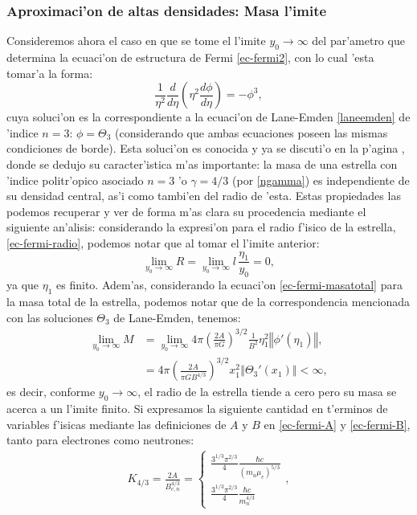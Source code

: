 \subsubsection{Aproximaci'on de altas densidades: Masa l'imite}\label{sec:ec-fermi-masalimite}
Consideremos ahora el caso en que se tome el l'imite $y_0\to\infty$ del par'ametro que determina la ecuaci'on de estructura de Fermi \eqref{ec-fermi2}, con lo cual 'esta tomar'a la forma:
\begin{equation}
\frac{1}{\eta^2}\frac{d}{d\eta}\left(\eta^2\frac{d\phi}{d\eta}\right)=-\phi^3,
\end{equation}
cuya soluci'on es la correspondiente a la  ecuaci'on de Lane-Emden \eqref{laneemden} de 'indice $n=3$: $\phi=\Theta_{3}$ (considerando que ambas ecuaciones poseen las mismas condiciones de borde). Esta soluci'on es conocida y ya se discuti'o en la p'agina \pageref{masa4/3}, donde se dedujo su caracter'istica m'as importante: la masa de una estrella con 'indice politr'opico asociado  $n=3$ 'o $\gamma=4/3$ (por \eqref{ngamma}) es independiente de su densidad central, as'i como tambi'en del radio de 'esta. Estas propiedades las podemos recuperar y ver de forma m'as clara su procedencia mediante el siguiente an'alisis: considerando la expresi'on para el radio f'isico de la estrella, \eqref{ec-fermi-radio}, podemos notar que al tomar el l'imite anterior:
\begin{equation}
 \lim_{y_0\to\infty}R=\lim_{y_0\to\infty}l\,\frac{\eta_1}{y_0}=0,
\end{equation}
ya que $\eta_1$ es finito. Adem'as, considerando la ecuaci'on \eqref{ec-fermi-masatotal} para la masa total de la estrella, podemos notar que de la correspondencia mencionada con las soluciones $\Theta_3$ de Lane-Emden, tenemos:
\begin{align}
 \lim_{y_0\to\infty}M&= \lim_{y_0\to\infty}4\pi\left(\frac{2A}{\pi G}\right)^{3/2}\frac{1}{B^2}\eta_1^2\left\Vert\phi'(\eta_1)\right\Vert,\\
&=4\pi\left(\frac{2A}{\pi GB^{4/3}}\right)^{3/2}x_1^2\left\Vert\Theta_3'(x_1)\right\Vert<\infty,\label{ec-fermi-masachandra}
\end{align}
es decir, conforme $y_0\to\infty$, el radio de la estrella tiende a cero pero su masa se acerca a un l'imite finito. Si expresamos la siguiente cantidad en t'erminos de variables f'isicas mediante las definiciones de $A$ y $B$ en \eqref{ec-fermi-A} y \eqref{ec-fermi-B}, tanto para electrones como neutrones:
\begin{align}\label{ec-fermi-k4/3}
 K_{4/3}=\frac{2A}{B_{e,n}^{4/3}}=\begin{cases}
\frac{3^{1/3}\pi^{2/3}}{4}\frac{\hbar c }{(m_u\mu_e)^{5/3}}\\
\frac{3^{1/3}\pi^{2/3}}{4}\frac{\hbar c }{m_n^{4/3}}
\end{cases},
\end{align}
